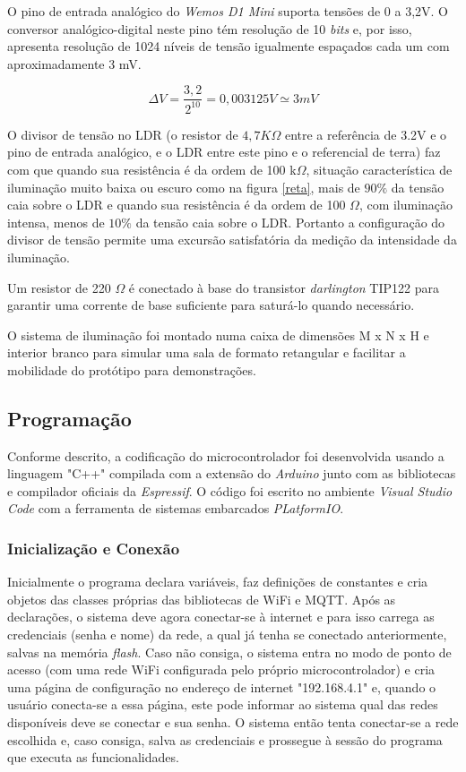 O pino de entrada analógico do \textit{Wemos D1 Mini} suporta tensões de 0 a 3,2V. O conversor analógico-digital neste pino tém resolução de 10 \textit{bits} e, por isso, apresenta resolução de 1024 níveis de tensão igualmente espaçados cada um com aproximadamente 3 mV.

\begin{equation}
    \label{eq:pj_1}
    \Delta V = \frac{3,2}{2^{10}} = 0,003125 V \simeq 3 mV
\end{equation}

O divisor de tensão no LDR (o resistor de $4,7K\Omega$ entre a referência de 3.2V e o pino de entrada analógico, e o LDR entre este pino e o referencial de terra) faz com que quando sua resistência é da ordem de 100 k$\Omega$, situação característica de iluminação muito baixa ou escuro como na figura \ref{reta}, mais de $90\%$ da tensão caia sobre o LDR e quando sua resistência é da ordem de 100 $\Omega$, com iluminação intensa, menos de $10\%$ da tensão caia sobre o LDR. Portanto a configuração do divisor de tensão permite uma excursão satisfatória da medição da intensidade da iluminação.

Um resistor de 220 $\Omega$ é conectado à base do transistor \textit{darlington} TIP122 para garantir uma corrente de base suficiente para saturá-lo quando necessário.

O sistema de iluminação foi montado numa caixa de dimensões M x N x H e interior branco para simular uma sala de formato retangular e facilitar a mobilidade do protótipo para demonstrações.

\subsection{Programação}

Conforme descrito, a codificação do microcontrolador foi desenvolvida usando a linguagem "C++" compilada com a extensão do \textit{Arduino} junto com as bibliotecas e compilador oficiais da \textit{Espressif}. O código foi escrito no ambiente \textit{Visual Studio Code} com a ferramenta de sistemas embarcados \textit{PLatformIO}.

\subsubsection{Inicialização e Conexão}

Inicialmente o programa declara variáveis, faz definições de constantes e cria objetos das classes próprias das bibliotecas de \ac{WiFi} e \ac{MQTT}. Após as declarações, o sistema deve agora conectar-se à internet e para isso carrega as credenciais (senha e nome) da rede, a qual já tenha se conectado anteriormente, salvas na memória \textit{flash}. Caso não consiga, o sistema entra no modo de ponto de acesso (com uma rede WiFi configurada pelo próprio microcontrolador) e cria uma página de configuração no endereço de internet "192.168.4.1" e, quando o usuário conecta-se a essa página, este pode informar ao sistema qual das redes disponíveis deve se conectar e sua senha. O sistema então tenta conectar-se a rede escolhida e, caso consiga, salva as credenciais e prossegue à sessão do programa que executa as funcionalidades. 

